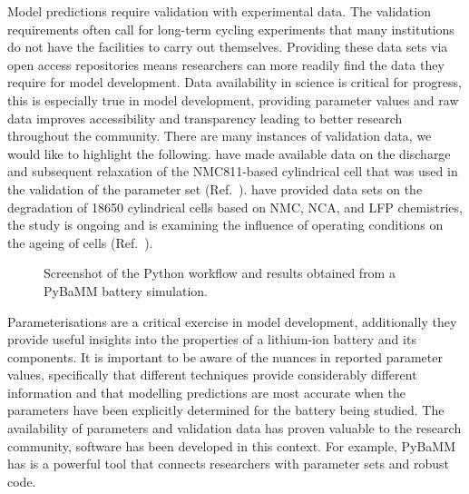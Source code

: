 \documentclass[aps,prb,twocolumn,superscriptaddress,reprint]{revtex4-1}
\begin{document}
Model predictions require validation with experimental data. 
The validation requirements often call for long-term cycling experiments that many institutions do not have the facilities to carry out themselves. 
Providing these data sets via open access repositories means researchers can more readily find the data they require for model development. 
Data availability in science is critical for progress, this is especially true in model development, providing parameter values and raw data improves accessibility and transparency leading to better research throughout the community. 
There are many instances of validation data, we would like to highlight the following. 
\citeauthor{Chen2020} have made available data on the discharge and subsequent relaxation of the NMC811-based cylindrical cell that was used in the validation of the parameter set (Ref.~). \cite{Chen2020}
\citeauthor{Devie_2018} have provided data sets on the degradation of 18650 cylindrical cells based on NMC, NCA, and LFP chemistries, the study is ongoing and is examining the influence of operating conditions on the ageing of cells (Ref.~). \cite{Devie_2018}

\begin{figure}[tb]
    \centering
    \caption{\label{fig:pybamm} Screenshot of the Python workflow and results obtained from a PyBaMM battery simulation.} 
\end{figure}

Parameterisations are a critical exercise in model development, additionally they provide useful insights into the properties of a lithium-ion battery and its components. 
It is important to be aware of the nuances in reported parameter values, specifically that different techniques provide considerably different information and that modelling predictions are most accurate when the parameters have been explicitly determined for the battery being studied. 
The availability of parameters and validation data has proven valuable to the research community, software has been developed in this context. 
For example, PyBaMM has is a powerful tool that connects researchers with parameter sets and robust code.  
\end{document}
